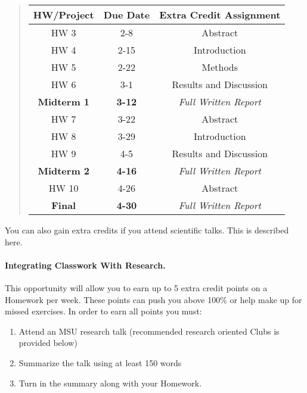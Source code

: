 \documentclass[%
oneside,                 %
final,                   %
10pt]{article}
\begin{document}
\begin{quote}
\begin{tabular}{ccc}
\hline
\multicolumn{1}{c}{ HW/Project } & \multicolumn{1}{c}{ Due Date } & \multicolumn{1}{c}{ Extra Credit Assignment } \\
\hline
HW 3               & 2-8           & Abstract                   \\
HW 4               & 2-15          & Introduction               \\
HW 5               & 2-22          & Methods                    \\
HW 6               & 3-1           & Results and Discussion     \\
\textbf{Midterm 1} & \textbf{3-12} & \emph{Full Written Report} \\
HW 7               & 3-22          & Abstract                   \\
HW 8               & 3-29          & Introduction               \\
HW 9               & 4-5           & Results and Discussion     \\
\textbf{Midterm 2} & \textbf{4-16} & \emph{Full Written Report} \\
HW 10              & 4-26          & Abstract                   \\
\textbf{Final}     & \textbf{4-30} & \emph{Full Written Report} \\
\hline
\end{tabular}
\end{quote}

\noindent

You can also gain extra credits if you attend scientific talks.
This is described here.


\paragraph{Integrating Classwork With Research.}
This opportunity will allow you to earn up to 5 extra credit points on a Homework per week. These points can push you above 100\% or help make up for missed exercises.
In order to earn all points you must:

\begin{enumerate}
\item Attend an MSU research talk (recommended research oriented Clubs is  provided below)

\item Summarize the talk using at least 150 words

\item Turn in the summary along with your Homework.
\end{enumerate}
\end{document}
